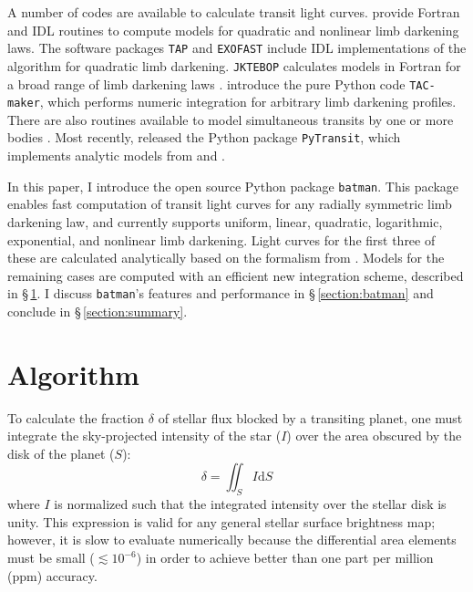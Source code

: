 \documentclass[12pt,preprint]{aastex}
\begin{document}
A number of codes are available to calculate transit light curves. \cite{mandel02} provide Fortran and IDL routines to compute models for quadratic and nonlinear limb darkening laws. The software packages \texttt{TAP} \citep{gazak12} and \texttt{EXOFAST} \citep{eastman13} include IDL implementations of the \cite{mandel02} algorithm for quadratic limb darkening. \texttt{JKTEBOP} calculates models in Fortran for a broad range of limb darkening laws \citep{southworth04}. \cite{kjurkchieva13} introduce the pure Python code \texttt{TAC-maker}, which performs numeric integration for arbitrary limb darkening profiles. There are also routines available to model simultaneous transits by one or more bodies \citep{kipping11, pal12}.  Most recently, \cite{parvianinen15} released the Python package \texttt{PyTransit}, which implements analytic models from \cite{mandel02} and \cite{gimenez06}.  

In this paper, I introduce the open source Python package \texttt{batman}.  This package enables fast computation of transit light curves for any radially symmetric limb darkening law, and currently supports uniform, linear, quadratic, logarithmic, exponential, and nonlinear limb darkening. Light curves for the first three of these are calculated analytically based on the formalism from \cite{mandel02}.  Models for the remaining cases are computed with an efficient new integration scheme, described in \S\,\ref{section:algorithm}. I discuss \texttt{batman}'s features and performance in \S\,\ref{section:batman} and conclude in \S\,\ref{section:summary}.


\section{Algorithm}
\label{section:algorithm}
To calculate the fraction $\delta$ of stellar flux blocked by a transiting planet, one must integrate the sky-projected intensity of the star ($I$) over the area obscured by the disk of the planet ($S$):
\begin{equation}
\delta = \iint_S{I \mathrm{d}S}
\label{eqn:surfaceint}
\end{equation}
where $I$ is normalized such that the integrated intensity over the stellar disk is unity. This expression is valid for any general stellar surface brightness map; however, it is slow to evaluate numerically because the differential area elements must be small ($\lesssim 10^{-6}$) in order to achieve better than one part per million (ppm) accuracy.
\end{document}
